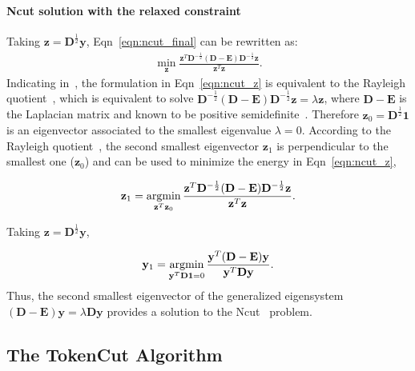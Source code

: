 \documentclass[twocolumn]{article}
\newcommand{\argmin}{\operatornamewithlimits{argmin}}
\newcommand{\indicatory}{\mathbf{y}}
\newcommand{\indicatorz}{\mathbf{z}}
\newcommand{\Degree}{\mathbf{D}}
\begin{document}
\paragraph*{Ncut solution with the relaxed constraint}
Taking $\indicatorz = \Degree ^{\frac{1}{2}}\indicatory$, Eqn~\ref{eqn:ncut_final} can be rewritten as: 
\begin{align}
	\label{eqn:ncut_z}
	\min_{\indicatorz} \frac{\indicatorz^T \Degree ^{-\frac{1}{2}} (\Degree - \mathbf{E}) \Degree ^{-\frac{1}{2}} \indicatorz}{\indicatorz^T \indicatorz}.
\end{align}
Indicating in~\cite{shi2000normalized}, the formulation in Eqn~\ref{eqn:ncut_z} is equivalent to the Rayleigh quotient~\cite{van1996matrix}, which is equivalent to solve $\Degree ^{-\frac{1}{2}} (\Degree - \mathbf{E}) \Degree ^{-\frac{1}{2}} \indicatorz = \lambda \indicatorz$, where $\Degree - \mathbf{E}$ is the Laplacian matrix and known to be positive semidefinite~\cite{pothen1990partitioning}. Therefore $\indicatorz_0 =  \Degree ^{\frac{1}{2}} \mathbf{1}$ is an eigenvector associated to the smallest eigenvalue $ \lambda = 0$. According to the Rayleigh quotient~\cite{van1996matrix}, the second smallest  eigenvector $\indicatorz_1$ is perpendicular to the smallest one ($\indicatorz_0$) and can be used to minimize the energy in Eqn~\ref{eqn:ncut_z},


\begin{align}
\indicatorz_1 = \argmin_{ \indicatorz^T \indicatorz_0} \frac{\indicatorz^T \Degree ^{-\frac{1}{2}} (\Degree - \mathbf{E}) \Degree ^{-\frac{1}{2}} \indicatorz}{\indicatorz^T \indicatorz}. \nonumber 
\end{align}   
  

Taking $\indicatorz = \Degree ^{\frac{1}{2}}\indicatory$,


\begin{align}
	\indicatory_1 = \argmin_{ \indicatory^T \Degree \mathbf{1} = 0} \frac{\indicatory^T (\Degree - \mathbf{E})  \indicatory}{\indicatory^T \Degree \indicatory}. \nonumber 
\end{align}
Thus, the second smallest eigenvector of the generalized
eigensystem $(\Degree - \mathbf{E})  \indicatory = \lambda  \Degree \indicatory$ provides a solution to the Ncut~\cite{shi2000normalized} problem.



\subsection{The TokenCut Algorithm}
\label{sec:tokencut}
\end{document}
